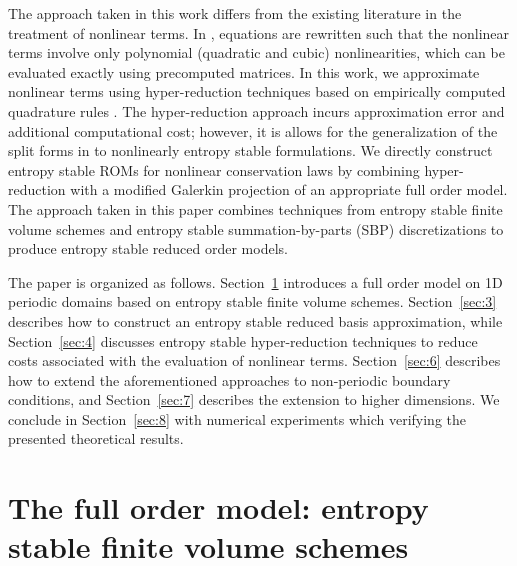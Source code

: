 \documentclass[preprint,10pt]{elsarticle}
\theoremstyle{definition}
\theoremstyle{lemma}
\theoremstyle{theorem}
\theoremstyle{assumption}
\begin{document}
The approach taken in this work differs from the existing literature in the treatment of nonlinear terms.  In \cite{maboudi2018conservative}, equations are rewritten such that the nonlinear terms involve only polynomial (quadratic and cubic) nonlinearities, which can be evaluated exactly using precomputed matrices.  In this work, we approximate nonlinear terms using hyper-reduction techniques based on empirically computed quadrature rules \cite{an2008optimizing, hernandez2017dimensional}.  The hyper-reduction approach incurs approximation error and additional computational cost; however, it is allows for the generalization of the split forms in \cite{maboudi2018conservative} to nonlinearly entropy stable formulations.  We directly construct entropy stable ROMs for nonlinear conservation laws by combining hyper-reduction with a modified Galerkin projection of an appropriate full order model.  The approach taken in this paper combines techniques from entropy stable finite volume schemes \cite{tadmor1987numerical, tadmor2003entropy} and entropy stable summation-by-parts (SBP) discretizations \cite{fisher2013high, carpenter2014entropy, chen2017entropy, crean2018entropy, chan2017discretely, chan2019skew} to produce entropy stable reduced order models.  

The paper is organized as follows.  Section~\ref{sec:2} introduces a full order model on 1D periodic domains based on entropy stable finite volume schemes.  Section~\ref{sec:3} describes how to construct an entropy stable reduced basis approximation, while Section~\ref{sec:4} discusses entropy stable hyper-reduction techniques to reduce costs associated with the evaluation of nonlinear terms.  Section~\ref{sec:6} describes how to extend the aforementioned approaches to non-periodic boundary conditions, and Section~\ref{sec:7} describes the extension to higher dimensions.  We conclude in Section~\ref{sec:8} with numerical experiments which verifying the presented theoretical results.



\section{The full order model: entropy stable finite volume schemes}
\label{sec:2}
\end{document}
